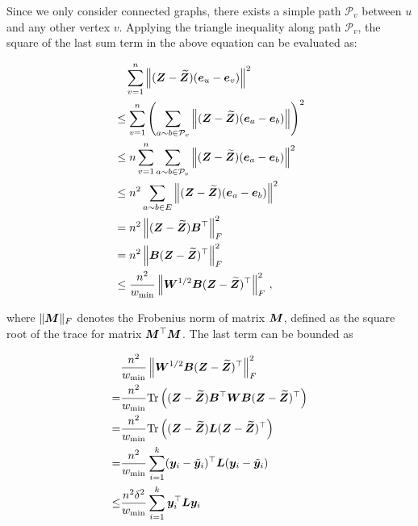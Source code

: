 \documentclass[10pt,journal,compsoc,twocolumn,twoside]{IEEEtran}
\begin{document}
\begin{IEEEproof}
    Since we only consider connected graphs,   there exists a simple path \(\mathcal{P}_v\) between \(u\) and any other vertex \(v\).  Applying the triangle inequality along path \(\mathcal{P}_v\), the square of the last sum term in the above equation can be evaluated as:
    \begin{small}
        \begin{align*}
             & \quad \sum_{v=1}^{n} \left\Vert(\boldsymbol{Z}-\widetilde{\boldsymbol{Z}})(\boldsymbol{e}_u-\boldsymbol{e}_v)\right\Vert^2                                             \\
             & \le \sum_{v=1}^{n} \left(\sum_{a\sim b \in \mathcal{P}_v} \left\Vert(\boldsymbol{Z}-\widetilde{\boldsymbol{Z}})(\boldsymbol{e}_a-\boldsymbol{e}_b)\right\Vert\right)^2 \\
             & \le n \sum_{v=1}^{n} \sum_{a\sim b \in \mathcal{P}_v} \left\Vert(\boldsymbol{Z}-\widetilde{\boldsymbol{Z}})(\boldsymbol{e}_a-\boldsymbol{e}_b)\right\Vert^2            \\
             & \le n^2 \sum_{a\sim b \in E} \left\Vert(\boldsymbol{Z}-\widetilde{\boldsymbol{Z}})(\boldsymbol{e}_a-\boldsymbol{e}_b)\right\Vert^2                                     \\
             & = n^2 \left\Vert(\boldsymbol{Z} - \widetilde{\boldsymbol{Z}} ) \boldsymbol{B}^{\top}\right\Vert_{F}^{2}                                                       \\
             & = n^2 \left\Vert\boldsymbol{B}(\boldsymbol{Z} - \widetilde{\boldsymbol{Z}} )^{\top}\right\Vert_{F}^{2}                                                        \\
             & \leq
            \frac{n^2}{w_{\min}} \left\Vert\boldsymbol{W}^{1/2} \boldsymbol{B}(\boldsymbol{Z} - \widetilde{\boldsymbol{Z}} )^{\top}\right\Vert_{F}^{2}\,,
        \end{align*}
    \end{small}
    where \(\| \boldsymbol{M} \|_{F}\) denotes the Frobenius norm of  matrix \(\boldsymbol{M}\),  defined as the square root of the trace for matrix \(\boldsymbol{M}^{\top} \boldsymbol{M}\). The last term can be bounded as
    \begin{small}
        \begin{align*}
                & \frac{n^2}{w_{\min}} \Abs{\matw^{1/2} \matb(\matz - \tilmatz )^{\top}}_{F}^{2}                      \\
            =   & \frac{n^2}{w_{\min}} \trace{(\matz - \tilmatz )\matb^{\top} \matw \matb(\matz - \tilmatz )^{\top}}  \\
            =   & \frac{n^2}{w_{\min}} \trace{(\matz - \tilmatz )\lap(\matz - \tilmatz )^{\top}}                      \\
            =   & \frac{n^2}{w_{\min}} \sum_{i=1}^k (\vecz_i - \tilde{\vecz}_i)^\top \lap (\vecz_i - \tilde{\vecz}_i) \\
            \le & \frac{n^2\delta^2}{w_{\min}} \sum_{i=1}^k \vecz_i^\top\lap\vecz_i                                   \\

\end{align*}
\end{small}
\end{IEEEproof}
\end{document}
